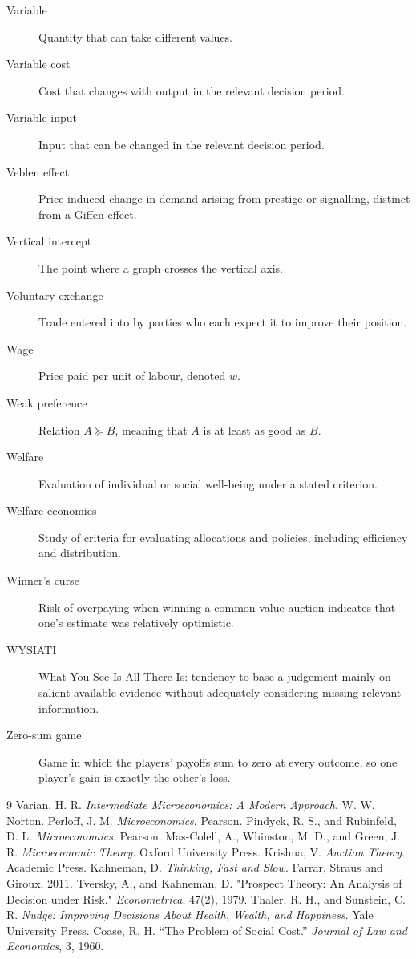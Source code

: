\begin{description}
  \item[Variable] Quantity that can take different values.
  \item[Variable cost] Cost that changes with output in the relevant decision period.
  \item[Variable input] Input that can be changed in the relevant decision period.
  \item[Veblen effect] Price-induced change in demand arising from prestige or signalling, distinct from a Giffen effect.
  \item[Vertical intercept] The point where a graph crosses the vertical axis.
  \item[Voluntary exchange] Trade entered into by parties who each expect it to improve their position.
  \item[Wage] Price paid per unit of labour, denoted $w$.
  \item[Weak preference] Relation $A\succeq B$, meaning that $A$ is at least as good as $B$.
  \item[Welfare] Evaluation of individual or social well-being under a stated criterion.
  \item[Welfare economics] Study of criteria for evaluating allocations and policies, including efficiency and distribution.
  \item[Winner's curse] Risk of overpaying when winning a common-value auction indicates that one's estimate was relatively optimistic.
  \item[WYSIATI] What You See Is All There Is: tendency to base a judgement mainly on salient available evidence without adequately considering missing relevant information.
  \item[Zero-sum game] Game in which the players' payoffs sum to zero at every outcome, so one player's gain is exactly the other's loss.
\end{description}

\renewcommand{\bibname}{References and Further Reading}
\begin{thebibliography}{9}
   Varian, H. R. \emph{Intermediate Microeconomics: A Modern Approach}. W. W. Norton.
   Perloff, J. M. \emph{Microeconomics}. Pearson.
   Pindyck, R. S., and Rubinfeld, D. L. \emph{Microeconomics}. Pearson.
   Mas-Colell, A., Whinston, M. D., and Green, J. R. \emph{Microeconomic Theory}. Oxford University Press.
   Krishna, V. \emph{Auction Theory}. Academic Press.
   Kahneman, D. \emph{Thinking, Fast and Slow}. Farrar, Straus and Giroux, 2011.
   Tversky, A., and Kahneman, D. "Prospect Theory: An Analysis of Decision under Risk." \emph{Econometrica}, 47(2), 1979.
   Thaler, R. H., and Sunstein, C. R. \emph{Nudge: Improving Decisions About Health, Wealth, and Happiness}. Yale University Press.
   Coase, R. H. ``The Problem of Social Cost.'' \emph{Journal of Law and Economics}, 3, 1960.
\end{thebibliography}

